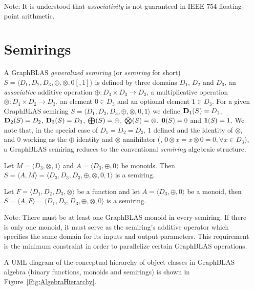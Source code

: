 Note: It is understood that \emph{associativity} is not guaranteed in IEEE 754 floating-point arithmetic.  

\section{Semirings}

A GraphBLAS \emph{generalized semiring} (or \emph{semiring} for short)
$S=\langle D_1,D_2,D_3,\oplus,\otimes,0 [,1] \rangle$ is defined by
three domains $D_1$, $D_2$ and $D_3$, an \emph{associative} additive operation $\oplus :
D_3 \times D_3 \rightarrow D_3$, 
a multiplicative operation $\otimes : D_1 \times D_2 \rightarrow
D_3$, an element $0 \in D_3$ and an optional element $1 \in D_3$.
For a given GraphBLAS semiring $S=\langle D_1,
D_2, D_3,\oplus,\otimes,0,1 \rangle$ we define $\bold{D}_1(S) = D_1$,
$\bold{D}_2(S) = D_2$, $\bold{D}_3(S) = D_3$, $\bold{\bigoplus}(S) =
\oplus$, $\bold{\bigotimes}(S) = \otimes$, ${\bf 0}(S) = 0$ and ${\bf 1}(S) =
1$. We note that, in the special case of $D_1 = D_2 = D_3$, $1$ defined 
and the identity of $\otimes$, and $0$ working as the $\oplus$ identity
and $\otimes$ annihilator (\ie, $0 \otimes x = x
\otimes 0 = 0, \forall x \in D_3$), a GraphBLAS semiring reduces to the
conventional \emph{semiring} algebraic structure.

Let $M = \langle D_3, \otimes,1 \rangle$ and $A = \langle D_3,\oplus,0 \rangle$ be monoids.
Then $S= \langle A,M \rangle = \langle D_3,D_3,D_3,\oplus,\otimes,0,1 \rangle$
is a semiring.

Let $F = \langle D_1,D_2,D_3,\otimes \rangle$ be a function
and let $A = \langle D_3,\oplus,0 \rangle$ be a monoid,
then $S= \langle A,F \rangle = \langle D_1,D_2,D_3,\oplus,\otimes,0 \rangle$
is a semiring.

Note: There must be at least one GraphBLAS monoid in every semiring. If there 
is only one monoid, it must serve as the semiring's additive operator which
specifies the same domain for its inputs and output parameters. This 
requirement is the minimum constraint in order to parallelize certain 
GraphBLAS operations.

A UML diagram of the conceptual hierarchy of object classes in GraphBLAS
algebra (binary functions, monoids and semirings) is shown in 
Figure~\ref{Fig:AlgebraHierarchy}.

